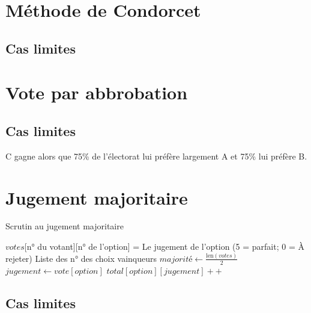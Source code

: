 \documentclass[../report]{subfiles}
\begin{document}
  \section{Méthode de Condorcet}
  \todo{}
  \subsection{Cas limites}
  \section{Vote par abbrobation}
  \todo{}
  
  \subsection{Cas limites}


  C gagne alors que 75\% de l'électorat lui préfère largement A et 75\% lui préfère B.

  \section{Jugement majoritaire}
  \todo{}
  
  \begin{algorithm}[H]
  \caption{Scrutin au jugement majoritaire}
  \label{scrutin:jugement-maj}
  \begin{algorithmic}[1]
  \REQUIRE $votes$[n° du votant][n° de l'option] = Le jugement de l'option (5 = parfait; 0 = À rejeter)
  \ENSURE Liste des n° des choix vainqueurs
  \STATE $majorité \leftarrow \frac{\text{len}(votes)}{2}$
      \STATE $jugement \leftarrow vote[option]$
      \STATE $total[option][jugement] ++$
    \ENDFOR
  \ENDFOR
  \end{algorithmic}
  \end{algorithm}

  \subsection{Cas limites}


\end{document}
